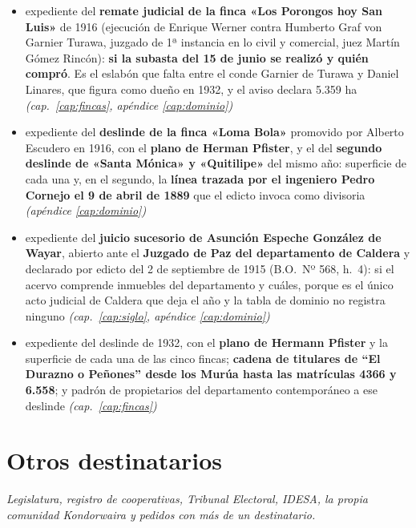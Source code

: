 \begin{itemize}[leftmargin=*]
\item expediente del \textbf{remate judicial de la finca «Los Porongos hoy San Luis»} de 1916 (ejecución de Enrique Werner contra Humberto Graf von Garnier Turawa, juzgado de 1ª instancia en lo civil y comercial, juez Martín Gómez Rincón): \textbf{si la subasta del 15 de junio se realizó y quién compró}. Es el eslabón que falta entre el conde Garnier de Turawa y Daniel Linares, que figura como dueño en 1932, y el aviso declara 5.359 ha \textit{(cap.\ \ref{cap:fincas}, apéndice \ref{cap:dominio})}
\item expediente del \textbf{deslinde de la finca «Loma Bola»} promovido por Alberto Escudero en 1916, con el \textbf{plano de Herman Pfister}, y el del \textbf{segundo deslinde de «Santa Mónica» y «Quitilipe»} del mismo año: superficie de cada una y, en el segundo, la \textbf{línea trazada por el ingeniero Pedro Cornejo el 9 de abril de 1889} que el edicto invoca como divisoria \textit{(apéndice \ref{cap:dominio})}
\item expediente del \textbf{juicio sucesorio de Asunción Espeche González de Wayar}, abierto ante el \textbf{Juzgado de Paz del departamento de Caldera} y declarado por edicto del 2 de septiembre de 1915 (B.O.\ Nº 568, h.\ 4): si el acervo comprende inmuebles del departamento y cuáles, porque es el único acto judicial de Caldera que deja el año y la tabla de dominio no registra ninguno \textit{(cap.\ \ref{cap:siglo}, apéndice \ref{cap:dominio})}
\item expediente del deslinde de 1932, con el \textbf{plano de Hermann Pfister} y la
superficie de cada una de las cinco fincas; \textbf{cadena de titulares de ``El Durazno o
Peñones'' desde los Murúa hasta las matrículas 4366 y 6.558}; y padrón de propietarios
del departamento contemporáneo a ese deslinde \textit{(cap.\ \ref{cap:fincas})}
\end{itemize}

\section{Otros destinatarios}

{\small\itshape Legislatura, registro de cooperativas, Tribunal Electoral, IDESA, la propia comunidad Kondorwaira y pedidos con más de un destinatario.\par}

